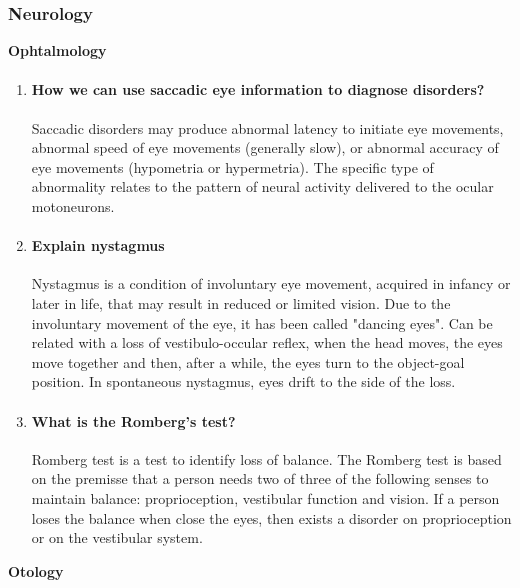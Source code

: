 \documentclass[12pt,article,oneside,a4paper]{memoir}
\begin{document}
\subsubsection{Neurology}
\textbf{Ophtalmology}\\
\begin{enumerate}
\item \paragraph{How we can use saccadic eye information to diagnose
disorders?}
Saccadic disorders may produce abnormal latency to initiate eye movements,
abnormal speed of eye movements (generally slow), or abnormal accuracy of eye
movements (hypometria or hypermetria). The specific type of abnormality relates
to the pattern of neural activity delivered to the ocular motoneurons.

\item \paragraph{Explain nystagmus}
Nystagmus is a condition of involuntary eye movement, acquired in infancy or
later in life, that may result in reduced or limited vision. Due to the
involuntary movement of the eye, it has been called "dancing eyes". Can be
related with a loss of vestibulo-occular reflex, when the head moves, the eyes
move together and then, after a while, the eyes turn to the object-goal position.
In spontaneous nystagmus, eyes drift to the side of the loss.

\item \paragraph{What is the Romberg's test?}
Romberg test is a test to identify loss of balance. The Romberg test is based
on the premisse that a person needs two of three of the following senses to
maintain balance: proprioception, vestibular function and vision. If a person
loses the balance when close the eyes, then exists a disorder on proprioception
or on the vestibular system.

\end{enumerate}
\textbf{Otology}\\
\end{document}
